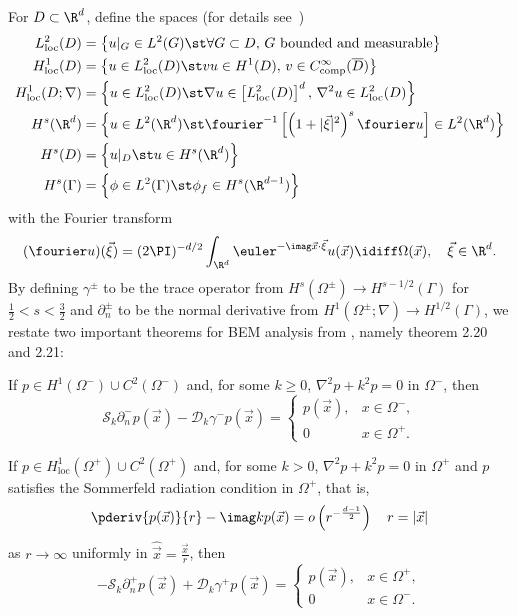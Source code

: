 For $D\subset\R^d$, define the spaces (for details see~\cite{Chandler_Wilde2012nab})
\begin{align*}
	L_{\mathrm{loc}}^2(D) &= \left\{u|_G\in L^2(G)\st \forall G\subset D,\, G \text{ bounded and measurable}\right\}\\
	H_{\mathrm{loc}}^1(D) &= \left\{u\in L_{\mathrm{loc}}^2(D)\st vu\in H^1(D),\, v\in C_{\mathrm{comp}}^\infty(\overline{D})\right\}\\
	H_{\mathrm{loc}}^1(D;\nabla) &= \left\{u\in L_{\mathrm{loc}}^2(D)\st \nabla u\in \left[L_{\mathrm{loc}}^2(D)\right]^d,\, \nabla^2 u\in L_{\mathrm{loc}}^2(D)\right\}\\
	H^s(\R^d) &= \left\{u\in L^2(\R^d)\st \fourier^{-1}\left[\left(1+|\vec{\xi}|^2\right)^s\fourier u\right]\in L^2(\R^d)\right\}\\
	H^s(D) &= \left\{u|_D\st u\in H^s(\R^d)\right\}\\
	H^s(\Gamma) &= \left\{\phi\in L^2(\Gamma)\st \phi_f\in H^s(\R^{d-1})\right\}
\end{align*}
with the Fourier transform
\begin{equation*}
	(\fourier u)(\vec{\xi}) = (2\PI)^{-d/2}\int_{\R^d}\euler^{-\imag \vec{x}\cdot \vec{\xi}}u(\vec{x})\idiff\Omega(\vec{x}),\quad\vec{\xi}\in\R^d.
\end{equation*}
By defining $\gamma^\pm$ to be the trace operator from $H^s(\Omega^\pm)\to H^{s-1/2}(\Gamma)$ for $\frac{1}{2}<s<\frac{3}{2}$ and $\partial_n^\pm$ to be the normal derivative from $H^1(\Omega^\pm; \nabla)\to H^{1/2}(\Gamma)$, we restate two important theorems for BEM analysis from \cite{Chandler_Wilde2012nab}, namely theorem 2.20 and 2.21:
\begin{theorem}\label{Thm:InteriorProblem}
	If $p\in H^1(\Omega^-)\cup C^2(\Omega^-)$ and, for some $k\geq 0$, $\nabla^2 p + k^2 p = 0$ in $\Omega^-$, then
	\begin{equation*}
		\mathcal{S}_k\partial_n^- p(\vec{x}) - \mathcal{D}_k\gamma^- p(\vec{x}) = \begin{cases} p(\vec{x}), & x\in\Omega^-,\\
		0 & x\in\Omega^+.\end{cases}
\end{equation*}	 
\end{theorem}
\begin{theorem}\label{Thm:ExteriorProblem}
	If $p\in H_{\mathrm{loc}}^1(\Omega^+)\cup C^2(\Omega^+)$ and, for some $k > 0$, $\nabla^2 p + k^2 p = 0$ in $\Omega^+$ and $p$ satisfies the Sommerfeld radiation condition in $\Omega^+$, that is,
\begin{equation*}
	\pderiv{p(\vec{x})}{r}-\imag k p(\vec{x}) = o\left(r^{-\frac{d-1}{2}}\right)\quad r=|\vec{x}|
\end{equation*}	
	as $r\to\infty$ uniformly in $\hat{\vec{x}}=\frac{\vec{x}}{r}$, then
\begin{equation*}
		-\mathcal{S}_k\partial_n^+ p(\vec{x}) + \mathcal{D}_k\gamma^+ p(\vec{x}) = \begin{cases} p(\vec{x}), & x\in\Omega^+,\\
		0 & x\in\Omega^-.\end{cases}
\end{equation*}	 
\end{theorem}
